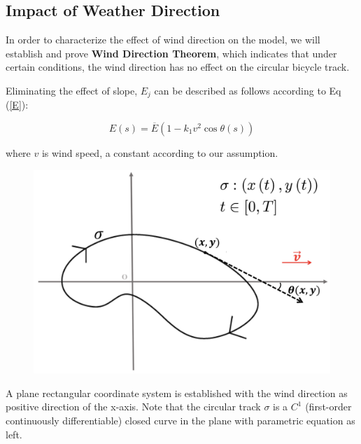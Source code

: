 \subsection{Impact of Weather Direction}

\par In order to characterize the effect of wind direction on the model, we will establish and prove {\bf Wind Direction Theorem}, which indicates that under certain conditions, the wind direction has no effect on the circular bicycle track. 

\par Eliminating the effect of slope, $E_j$ can be described as follows according to Eq (\ref{E}):

\begin{equation}
	E(s) = \overline{E}(1-k_1v^2\cos\theta(s))
\end{equation}
\begin{flushleft}
\par where $v$ is wind speed, a constant according to our assumption.
\end{flushleft}

\begin{figure} 
	\includegraphics[width=0.7\linewidth]{image/fig3}
	\label{fig3}
\end{figure}

 \par A plane rectangular coordinate system is established with the wind direction as positive direction of the x-axis. Note that the circular track $\sigma$ is a $C^1$ (first-order continuously differentiable) closed curve in the plane with parametric equation as left.

